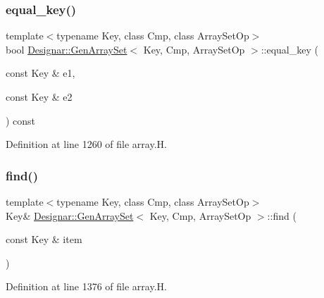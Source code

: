 \subsubsection{\texorpdfstring{equal\+\_\+key()}{equal\_key()}}
{\footnotesize\ttfamily template$<$typename Key, class Cmp, class Array\+Set\+Op$>$ \\
bool \hyperlink{class_designar_1_1_gen_array_set}{Designar\+::\+Gen\+Array\+Set}$<$ Key, Cmp, Array\+Set\+Op $>$\+::equal\+\_\+key (\begin{DoxyParamCaption}\item[{const Key \&}]{e1,  }\item[{const Key \&}]{e2 }\end{DoxyParamCaption}) const\hspace{0.3cm}{\ttfamily [inline]}}



Definition at line 1260 of file array.\+H.

\mbox{\label{class_designar_1_1_gen_array_set_a91015348562e7127f2612ad5c13fa016}} 
\subsubsection{\texorpdfstring{find()}{find()}\hspace{0.1cm}{\footnotesize\ttfamily [1/2]}}
{\footnotesize\ttfamily template$<$typename Key, class Cmp, class Array\+Set\+Op$>$ \\
Key\& \hyperlink{class_designar_1_1_gen_array_set}{Designar\+::\+Gen\+Array\+Set}$<$ Key, Cmp, Array\+Set\+Op $>$\+::find (\begin{DoxyParamCaption}\item[{const Key \&}]{item }\end{DoxyParamCaption})\hspace{0.3cm}{\ttfamily [inline]}}



Definition at line 1376 of file array.\+H.

\mbox{\label{class_designar_1_1_gen_array_set_aab0576267b8f88e6e7ec2d31aa768449}} 
